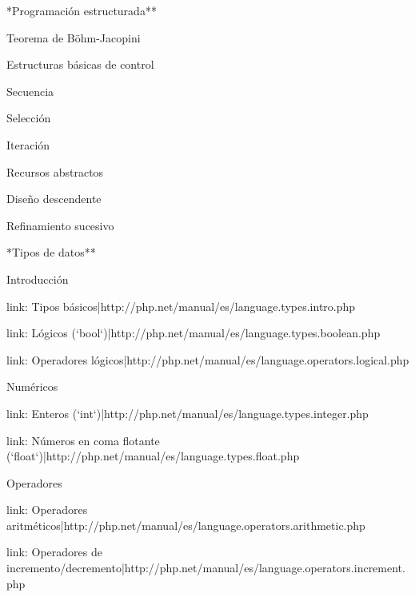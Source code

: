 \begin{longenum}
    \item **Programación estructurada**
    \begin{longenum}
        \item Teorema de Böhm-Jacopini
        \item Estructuras básicas de control
        \begin{longenum}
            \item Secuencia
            \item Selección
            \item Iteración
        \end{longenum}
        \item Recursos abstractos
        \item Diseño descendente
        \item Refinamiento sucesivo
    \end{longenum}
    \item **Tipos de datos**
    \begin{longenum}
        \item Introducción
        \item [link: Tipos básicos|http://php.net/manual/es/language.types.intro.php]
        \begin{longenum}
            \item [link: Lógicos (`bool`)|http://php.net/manual/es/language.types.boolean.php]
            \begin{longenum}
                \item [link: Operadores lógicos|http://php.net/manual/es/language.operators.logical.php]
            \end{longenum}
            \item Numéricos
            \begin{longenum}
                \item [link: Enteros (`int`)|http://php.net/manual/es/language.types.integer.php]
                \item [link: Números en coma flotante (`float`)|http://php.net/manual/es/language.types.float.php]
                \item Operadores
                \begin{longenum}
                    \item [link: Operadores aritméticos|http://php.net/manual/es/language.operators.arithmetic.php]
                    \item [link: Operadores de incremento/decremento|http://php.net/manual/es/language.operators.increment.php]

\end{longenum}
\end{longenum}
\end{longenum}
\end{longenum}
\end{longenum}
